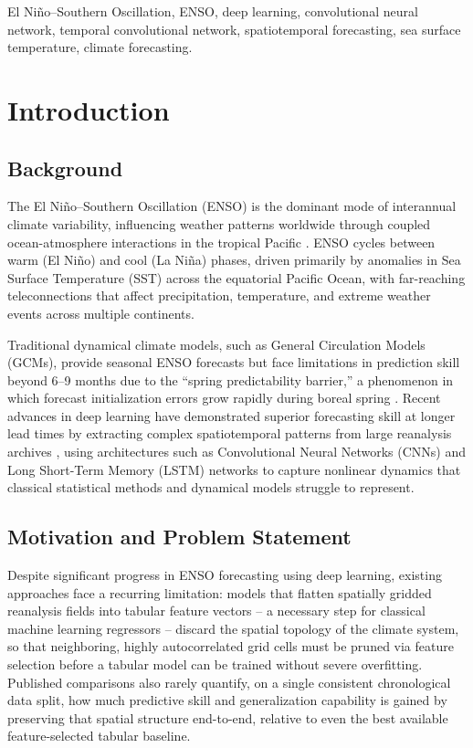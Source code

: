 \documentclass[conference]{IEEEtran}
\begin{document}
\begin{IEEEkeywords}
El Ni\~no--Southern Oscillation, ENSO, deep learning, convolutional neural network, temporal convolutional network, spatiotemporal forecasting, sea surface temperature, climate forecasting.
\end{IEEEkeywords}

\section{Introduction}

\subsection{Background}
The El Ni\~no--Southern Oscillation (ENSO) is the dominant mode of interannual climate variability, influencing weather patterns worldwide through coupled ocean-atmosphere interactions in the tropical Pacific \cite{ham2019}. ENSO cycles between warm (El Ni\~no) and cool (La Ni\~na) phases, driven primarily by anomalies in Sea Surface Temperature (SST) across the equatorial Pacific Ocean, with far-reaching teleconnections that affect precipitation, temperature, and extreme weather events across multiple continents.

Traditional dynamical climate models, such as General Circulation Models (GCMs), provide seasonal ENSO forecasts but face limitations in prediction skill beyond 6--9 months due to the ``spring predictability barrier,'' a phenomenon in which forecast initialization errors grow rapidly during boreal spring \cite{mahesh2024}. Recent advances in deep learning have demonstrated superior forecasting skill at longer lead times by extracting complex spatiotemporal patterns from large reanalysis archives \cite{ham2019, mahesh2024}, using architectures such as Convolutional Neural Networks (CNNs) and Long Short-Term Memory (LSTM) networks to capture nonlinear dynamics that classical statistical methods and dynamical models struggle to represent.

\subsection{Motivation and Problem Statement}
Despite significant progress in ENSO forecasting using deep learning, existing approaches face a recurring limitation: models that flatten spatially gridded reanalysis fields into tabular feature vectors -- a necessary step for classical machine learning regressors -- discard the spatial topology of the climate system, so that neighboring, highly autocorrelated grid cells must be pruned via feature selection before a tabular model can be trained without severe overfitting. Published comparisons also rarely quantify, on a single consistent chronological data split, how much predictive skill and generalization capability is gained by preserving that spatial structure end-to-end, relative to even the best available feature-selected tabular baseline.
\end{document}
